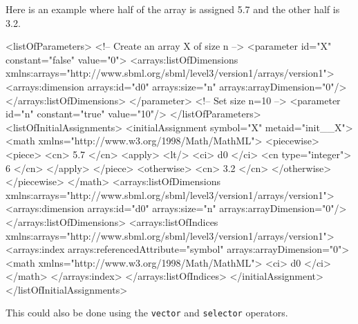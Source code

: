 Here is an example where half of the array is assigned 5.7 and the other half is 3.2. 

\begin{example}
<listOfParameters>
 <!-- Create an array X of size n -->
    <parameter id="X" constant="false" value="0">
        <arrays:listOfDimensions
            xmlns:arrays="http://www.sbml.org/sbml/level3/version1/arrays/version1">
            <arrays:dimension arrays:id="d0" arrays:size="n" arrays:arrayDimension="0"/>
        </arrays:listOfDimensions>
    </parameter>
    <!-- Set size n=10 -->
    <parameter id="n" constant="true" value="10"/>
</listOfParameters>
<listOfInitialAssignments>
    <initialAssignment symbol="X" metaid="init__X">
        <math
            xmlns="http://www.w3.org/1998/Math/MathML">
            <piecewise>
                <piece>
                    <cn> 5.7 </cn>
                    <apply>
                        <lt/>
                        <ci> d0 </ci>
                        <cn type="integer"> 6 </cn>
                    </apply>
                </piece>
                <otherwise>
                    <cn> 3.2 </cn>
                </otherwise>
            </piecewise>
        </math>
        <arrays:listOfDimensions
            xmlns:arrays="http://www.sbml.org/sbml/level3/version1/arrays/version1">
            <arrays:dimension arrays:id="d0" arrays:size="n" arrays:arrayDimension="0"/>
        </arrays:listOfDimensions>
        <arrays:listOfIndices
            xmlns:arrays="http://www.sbml.org/sbml/level3/version1/arrays/version1">
            <arrays:index arrays:referencedAttribute="symbol" arrays:arrayDimension="0">
                <math
                    xmlns="http://www.w3.org/1998/Math/MathML">
                    <ci> d0 </ci>
                </math>
            </arrays:index>
        </arrays:listOfIndices>
    </initialAssignment>
</listOfInitialAssignments>
\end{example}

This could also be done using the {\tt vector} and {\tt selector}  operators.

